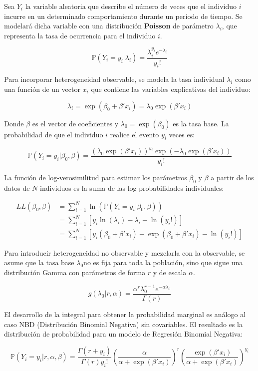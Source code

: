 \documentclass[
]{book}
\begin{document}
Sea \(Y_i\) la variable aleatoria que describe el número de veces que el
individuo \(i\) incurre en un determinado comportamiento durante un
período de tiempo. Se modelará dicha variable con una distribución
\textbf{Poisson} de parámetro \(\lambda_i\), que representa la tasa de
ocurrencia para el individuo \(i\).

\[\mathbb{P}(Y_i=y_i|\lambda_i) = \frac{\lambda_i^{y_i} e^{-\lambda_i}}{y_i!}\]

Para incorporar heterogeneidad observable, se modela la tasa individual
\(\lambda_i\) como una función de un vector \(x_i\) que contiene las
variables explicativas del individuo:

\[\lambda_i = \exp(\beta_0 + \beta'x_i) = \lambda_0 \exp(\beta'x_i)\]

Donde \(\beta\) es el vector de coeficientes y \(\lambda_0 = \exp(\beta_0)\)
es la tasa base. La probabilidad de que el individuo \(i\) realice el
evento \(y_i\) veces es:

\[
\mathbb{P}(Y_i = y_i|\beta_0, \beta) = \frac{(\lambda_0 \exp(\beta'x_i))^{y_i} \exp(-\lambda_0 \exp(\beta'x_i))}{y_i!}
\]

La función de log-verosimilitud para estimar los parámetros \(\beta_0\) y
\(\beta\) a partir de los datos de \(N\) individuos es la suma de las
log-probabilidades individuales:

\[
\begin{aligned}
LL(\beta_0, \beta) &= \sum_{i=1}^{N} \ln(\mathbb{P}(Y_i=y_i|\beta_0, \beta)) \\
&= \sum_{i=1}^{N} \left[ y_i \ln(\lambda_i) - \lambda_i - \ln(y_i!) \right] \\
&= \sum_{i=1}^{N} \left[ y_i (\beta_0 + \beta'x_i) - \exp(\beta_0 + \beta'x_i) - \ln(y_i!) \right]
\end{aligned}
\]

Para introducir heterogeneidad no observable y mezclarla con la
observable, se asume que la tasa base \(\lambda_0\)no es fija para toda la
población, sino que sigue una distribución Gamma con parámetros de forma
\(r\) y de escala \(\alpha\).

\[g(\lambda_0|r, \alpha) = \frac{\alpha^r \lambda_0^{r-1}e^{-\alpha\lambda_0}}{\Gamma(r)}\]

El desarrollo de la integral para obtener la probabilidad marginal es
análogo al caso NBD (Distribución Binomial Negativa) sin covariables. El
resultado es la distribución de probabilidad para un modelo de Regresión
Binomial Negativa:

\[
\mathbb{P} (Y_i = y_i|r, \alpha, \beta) = \frac{\Gamma(r+y_i)}{\Gamma(r)y_i!} \left(\frac{\alpha}{\alpha + \exp(\beta'x_i)}\right)^r \left(\frac{\exp(\beta'x_i)}{\alpha + \exp(\beta'x_i)}\right)^{y_i}
\]
\end{document}
